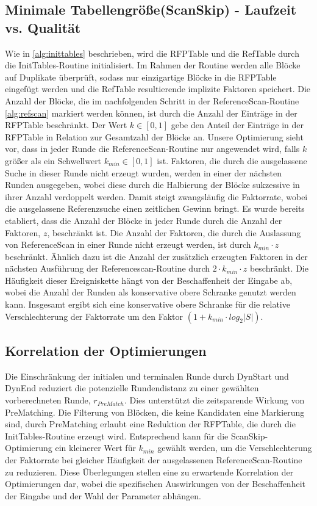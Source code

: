 \subsection{Minimale Tabellengröße(ScanSkip) - Laufzeit vs. Qualität}
Wie in \ref{alg:inittables} beschrieben, wird die RFPTable und die RefTable durch die InitTables-Routine initialisiert. Im Rahmen der Routine werden alle Blöcke auf Duplikate
überprüft, sodass nur einzigartige Blöcke in die RFPTable eingefügt werden und die RefTable resultierende implizite Faktoren speichert. Die Anzahl der Blöcke, die im nachfolgenden Schritt 
in der ReferenceScan-Routine \ref{alg:refscan} markiert werden können, ist durch die Anzahl der Einträge in der RFPTable beschränkt. Der Wert $k\in [0,1]$ gebe den Anteil der
Einträge in der RFPTable in Relation zur Gesamtzahl der Blöcke an. Unsere Optimierung sieht vor, dass in jeder Runde die ReferenceScan-Routine nur angewendet wird, falls $k$ größer
als ein Schwellwert $k_{min}\in [0,1]$ ist. Faktoren, die durch die ausgelassene Suche in dieser Runde nicht erzeugt wurden, werden in einer der nächsten Runden ausgegeben, wobei diese
durch die Halbierung der Blöcke sukzessive in ihrer Anzahl verdoppelt werden. Damit steigt zwangsläufig die Faktorrate, wobei die ausgelassene Referenzsuche einen zeitlichen Gewinn bringt.
Es wurde bereits etabliert, dass die Anzahl der Blöcke in jeder Runde durch die Anzahl der Faktoren, $z$, beschränkt ist. Die Anzahl der Faktoren, die durch die Auslassung von 
ReferenceScan in einer Runde nicht erzeugt werden, ist durch $k_{min} \cdot z$ beschränkt. Ähnlich dazu ist die Anzahl der zusätzlich erzeugten Faktoren in der nächsten Ausführung
der Referencescan-Routine durch $2 \cdot k_{min} \cdot z$ beschränkt. Die Häufigkeit dieser Ereigniskette hängt von der Beschaffenheit der Eingabe ab, wobei die Anzahl der
Runden als konservative obere Schranke genutzt werden kann. Insgesamt ergibt sich eine konservative obere Schranke für die relative Verschlechterung der Faktorrate um den Faktor 
$(1 + k_{min} \cdot {log_2{|S|}})$.

\subsection{Korrelation der Optimierungen}
Die Einschränkung der initialen und terminalen Runde durch DynStart und DynEnd reduziert die potenzielle Rundendistanz zu einer gewählten vorberechneten Runde, $r_{PreMatch}$.
Dies unterstützt die zeitsparende Wirkung von PreMatching. Die Filterung von Blöcken, die keine Kandidaten eine Markierung sind, durch PreMatching erlaubt eine Reduktion der 
RFPTable, die durch die InitTables-Routine erzeugt wird. Entsprechend kann für die ScanSkip-Optimierung ein kleinerer Wert für $k_{min}$ gewählt werden, um die Verschlechterung
der Faktorrate bei gleicher Häufigkeit der ausgelassenen ReferenceScan-Routine zu reduzieren. Diese Überlegungen stellen eine zu erwartende Korrelation der Optimierungen dar,
wobei die spezifischen Auswirkungen von der Beschaffenheit der Eingabe und der Wahl der Parameter abhängen.